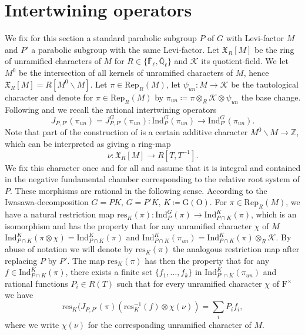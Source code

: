 \documentclass[10pt,a4paper]{article}
\theoremstyle{remark}
\theoremstyle{definition}
\newcommand{\fl}{{\overline{\mathbb{F}}_\ell}}
\newcommand{\ql}{{\overline{\mathbb{Q}}_\ell}}
\newcommand{\ip}{\mathrm{Ind}_P^G}
\newcommand{\id}{\mathrm{Ind}}
\newcommand{\xc}{\mathfrak{X}}
\newcommand{\repr}{\mathrm{Rep}_R}
\newcommand{\ji}{J_{P,P'}}
\newcommand{\un}{_{un}}
\newcommand{\res}{\mathrm{res}}
\newcommand{\ra}{\rightarrow}
\newcommand{\FF}{\mathrm{F}}
\newcommand{\io}{\mathrm{O}}
\newcommand{\ZZ}{\mathbb{Z}}
\newcommand{\cK}{\mathcal{K}}
\begin{document}
\section{Intertwining operators}
We fix for this section a standard parabolic subgroup $P$ of $G$ with Levi-factor $M$ and $P'$ a parabolic subgroup with the same Levi-factor. Let $\xc_R[M]$ be the ring of unramified characters of $M$ for $R\in\{\fl,\ql\}$ and $\cK$ its quotient-field. We let $M^0$ be the intersection of all kernels of unramified characters of $M$, hence $\xc_R[M]=R[M^0\backslash M]$.
Let $\pi\in\repr(M)$, let $\psi\un\colon M\ra \cK$ be the tautological character and denote for $\pi\in \repr(M)$ by $\pi\un\coloneqq \pi\otimes_R\cK\otimes\psi\un$ the base change.
Following \cite[§7]{Dat05} and \cite[§IV]{waldspurger2003plancherel} we recall the rational intertwining operators
\[J_{P,P'}(\pi\un)=J_{P,P'}^G(\pi\un)\colon \ip(\pi\un)\ra\id_{P'}^G(\pi\un).\]
Note that part of the construction of \cite[§7.3]{Dat05} is a certain additive character $M^0\backslash M\ra \ZZ$, which can be interpreted as giving a ring-map \[\nu\colon \xc_R[M]\ra R[T,T^{-1}].\] We fix this character once and for all and assume that it is integral and contained in the negative fundamental chamber corresponding to the relative root system of $P$.
These morphisms are rational in the following sense.
According to the Iwasawa-decomposition $G=PK,\,G=P'K,\,K\coloneqq \mathrm{G}(\io)$. For $\pi\in\repr(M)$, we have a natural restriction map $\res_K(\pi)\colon \ip(\pi)\ra\id_{P\cap K}^K(\pi)$, which is an isomorphism and has the property that for any unramified character $\chi$ of $M$
$\id_{P\cap K}^K(\pi\otimes\chi)=\id_{P\cap K}^K(\pi)$ and $\id_{P\cap K}^K(\pi\un)=\id_{P\cap K}^K(\pi)\otimes_R \cK$.
By abuse of notation we will denote by $\res_K(\pi)$ the analogous restriction map after replacing $P$ by $P'$.
The map $\res_K(\pi)$ has then the property that for any $f\in \id_{P\cap K}^K(\pi)$, there exists a finite set $\{f_1,\ldots,f_k\}$ in $\id_{P'\cap K}^K(\pi\un)$ and rational functions $P_i\in R(T)$ such that for every unramified character $\chi$ of $\FF^\times$ we have 
\[\res_K(\ji(\pi)(\res_K^{-1}(f)\otimes\chi(\nu))=\sum_iP_if_i,\] where we write $\chi(\nu)$ for the corresponding unramified character of $M$.
\end{document}
